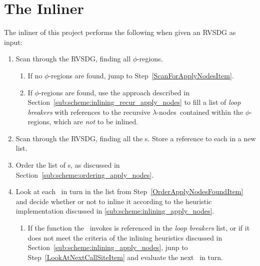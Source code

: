 
\clearpage
\section{The Inliner}
\label{scheme:start}


The inliner of this project performs the following when given an RVSDG as input:

\begin{enumerate}

	\item Scan through the RVSDG, finding all $\phi$-regions.

	\begin{enumerate}
		\item If no $\phi$-regions are found, jump to Step~\ref{ScanForApplyNodesItem}.

		\item If $\phi$-regions are found, use the approach described
in Section~\ref{sub:scheme:inlining_recur_apply_nodes} to fill a list of
\textit{loop breakers} with references to the recursive $\lambda$-nodes\
contained within the $\phi$-regions, which are \textit{not} to be
inlined.
		\label{MakeLoopBreakerListItem}
	\end{enumerate}

	\item Scan through the RVSDG, finding all the \applyNode s. Store a
reference to each in a new list.
	\label{ScanForApplyNodesItem}

	\item Order the list of \applyNode s, as discussed in
Section~\ref{sub:scheme:ordering_apply_nodes}.
	\label{OrderApplyNodesFoundItem}

	\item Look at each \applyNode~in turn in the list from
Step~\ref{OrderApplyNodesFoundItem} and decide whether or not to inline it
according to the heuristic implementation discussed in
\ref{sub:scheme:inlining_apply_nodes}.
	\label{LookAtNextCallSiteItem}

	\begin{enumerate}
		\item If the function the \applyNode~invokes is referenced in the
\textit{loop breakers} list, or if it does not meet the criteria of the inlining
heuristics discussed in Section~\ref{sub:scheme:inlining_apply_nodes}, junp to
Step~\ref{LookAtNextCallSiteItem} and evaluate the next \applyNode~in turn.


\end{enumerate}
\end{enumerate}
